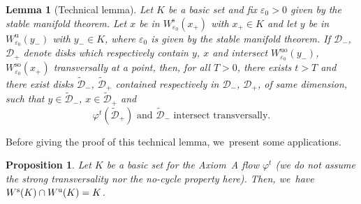 \documentclass[JEP,XML,SOM,Unicode,NoEqCountersInSection,NoFloatCountersInSection,published]{cedram}
\newcommand{\rs}{\mathrm{s}}
\newcommand{\rso}{\mathrm{so}}
\newcommand{\ru}{\mathrm{u}}
\newcommand{\ruo}{\mathrm{uo}}
\theoremstyle{definition}
\theoremstyle{plain}
\newtheorem{prop}[definition]{Proposition}
\newtheorem{lemma}[definition]{Lemma}
\newcommand{\D}{\mathcal{D}}
\begin{document}
\begin{appendix}
\begin{lemma}[Technical lemma]\label{lemma: technical lemma appendix}
Let $K$ be a basic set and fix $\varepsilon_0 > 0$ given by the stable manifold theorem. Let $x$ be in $W_{\varepsilon_0}^\rs (x_+)$ with $x_+ \in K$ and let $y$ be in $W_{\varepsilon_0}^\ru (y_-)$ with $y_- \in K$, where $\varepsilon_0$ is given by the stable manifold theorem. If $\D_-$, $\D_+$ denote disks which respectively contain $y$, $x$ and intersect $W_{\varepsilon_0}^{\ruo} (y_-)$, $W_{\varepsilon_0}^{\rso} (x_+)$ transversally at a point, then, for all $T > 0$, there exists $t > T$ and there exist disks $\widetilde{\D}_-$, $\widetilde{\D}_+$ contained respectively in $\D_-$, $\D_+$, of same dimension, such that $y \in \widetilde{\D}_-$, $x \in \widetilde{\D}_+$ and
\[
\varphi^t (\widetilde{\D}_{+}) \text{ and } \widetilde{\D}_{-} \text{ intersect transversally}.
\]
\end{lemma}

Before giving the proof of this technical lemma, we~present some applications.

\begin{prop}\label{Appendix: prop intersection stable unstable sets of basic sets}
Let $K$ be a basic set for the Axiom~A flow $\varphi^t$ (we do not assume the strong transversality nor the no-cycle property here). Then, we~have $W^\rs (K) \cap\nobreak W^\ru (K) = K$.
\end{prop}


\end{appendix}
\end{document}
